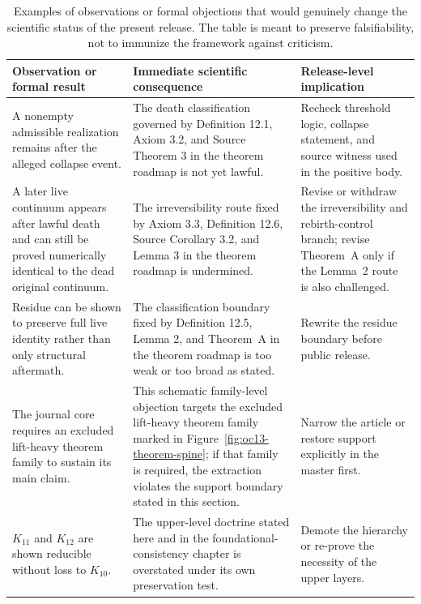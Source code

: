 \begin{table}[htbp]
\centering
\begingroup
\footnotesize
\RaggedRight
\setlength{\tabcolsep}{4pt}
\begin{tabular}{@{}L{0.27\textwidth}L{0.36\textwidth}L{0.22\textwidth}@{}}
\toprule
\textbf{Observation or formal result} & \textbf{Immediate scientific consequence} & \textbf{Release-level implication} \\
\midrule
A nonempty admissible realization remains after the alleged collapse event. & The death classification governed by Definition 12.1, Axiom 3.2, and Source Theorem 3 in the theorem roadmap is not yet lawful. & Recheck threshold logic, collapse statement, and source witness used in the positive body. \\
A later live continuum appears after lawful death and can still be proved numerically identical to the dead original continuum. & The irreversibility route fixed by Axiom 3.3, Definition 12.6, Source Corollary 3.2, and Lemma 3 in the theorem roadmap is undermined. & Revise or withdraw the irreversibility and rebirth-control branch; revise Theorem~A only if the Lemma~2 route is also challenged. \\
Residue can be shown to preserve full live identity rather than only structural aftermath. & The classification boundary fixed by Definition 12.5, Lemma 2, and Theorem~A in the theorem roadmap is too weak or too broad as stated. & Rewrite the residue boundary before public release. \\
The journal core requires an excluded lift-heavy theorem family to sustain its main claim. & This schematic family-level objection targets the excluded lift-heavy theorem family marked in Figure~\ref{fig:oc13-theorem-spine}; if that family is required, the extraction violates the support boundary stated in this section. & Narrow the article or restore support explicitly in the master first. \\
\(K_{11}\) and \(K_{12}\) are shown reducible without loss to \(K_{10}\). & The upper-level doctrine stated here and in the foundational-consistency chapter is overstated under its own preservation test. & Demote the hierarchy or re-prove the necessity of the upper layers. \\
\bottomrule
\end{tabular}
\endgroup
\caption{Examples of observations or formal objections that would genuinely change the scientific
status of the present release. The table is meant to preserve falsifiability, not to immunize the
framework against criticism.}
\label{tab:oc13-counterexamples}
\end{table}

